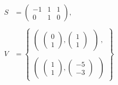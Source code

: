 \begin{align*}
    S &= \begin{pmatrix}
        -1 & 1 & 1 \\
        0 & 1 & 0
    \end{pmatrix}, \ \\ \\
    V &= \begin{Bmatrix}
        \begin{pmatrix}
              \begin{pmatrix}
                    0 \\
                    1
               \end{pmatrix},
               \begin{pmatrix}
                     1 \\
                     1
               \end{pmatrix}
        \  \end{pmatrix}\ , \\ \\
        \begin{pmatrix}
               \begin{pmatrix}
                    1 \\
                    1
               \end{pmatrix},
               \begin{pmatrix}
                    -5 \\
                    -3
              \end{pmatrix}
        \ \end{pmatrix}
    \end{Bmatrix}
\end{align*}
